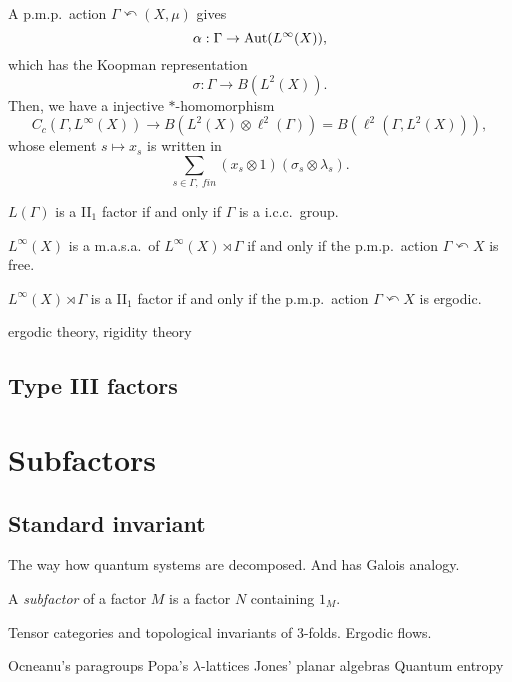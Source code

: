 \documentclass{../../large}
\begin{document}
\section{}
\begin{prb}
A p.m.p.~action $\Gamma\curvearrowleft(X,\mu)$ gives
\[\alpha:\Gamma\to\operatorname{Aut}(L^\infty(X)),\]
which has the Koopman representation
\[\sigma:\Gamma\to B(L^2(X)).\]
Then, we have a injective $*$-homomorphism
\[C_c(\Gamma,L^\infty(X))\to B(L^2(X)\otimes\ell^2(\Gamma))=B(\ell^2(\Gamma,L^2(X))),\]
whose element $s\mapsto x_s$ is written in
\[\sum_{s\in\Gamma,\ fin}(x_s\otimes1)(\sigma_s\otimes\lambda_s).\]

\begin{parts}
\item $L(\Gamma)$ is a II$_1$ factor if and only if $\Gamma$ is a i.c.c.~group.
\item $L^\infty(X)$ is a m.a.s.a.~of $L^\infty(X)\rtimes\Gamma$ if and only if the p.m.p.~action $\Gamma\curvearrowleft X$ is free.
\item $L^\infty(X)\rtimes\Gamma$ is a II$_1$ factor if and only if the p.m.p.~action $\Gamma\curvearrowleft X$ is ergodic.
\end{parts}
\end{prb}

ergodic theory, rigidity theory

\chapter{Type III factors}



\part{Subfactors}


\chapter{Standard invariant}

The way how quantum systems are decomposed.
And has Galois analogy.

\begin{prb}
A \emph{subfactor} of a factor $M$ is a factor $N$ containing $1_M$.
\end{prb}

Tensor categories and topological invariants of 3-folds.
Ergodic flows.


Ocneanu's paragroups
Popa's $\lambda$-lattices
Jones' planar algebras
Quantum entropy
\end{document}
